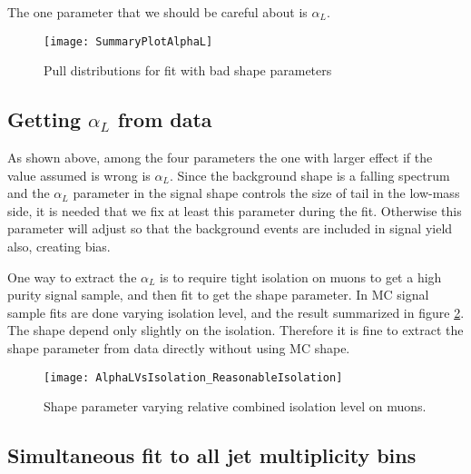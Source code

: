 \documentclass{cmspaper}
\begin{document}
The one parameter that we should be careful about is $\alpha_L$.

\begin{figure}
   \centering
   \texttt{[image: SummaryPlotAlphaL]}
   \caption{Pull distributions for fit with bad shape parameters}
   \label{Figure_BadShapePulls}
\end{figure}


\subsection{Getting $\alpha_L$ from data}

As shown above, among the four parameters the one with larger effect
if the value assumed is wrong is $\alpha_L$.  Since the background
shape is a falling spectrum and the $\alpha_L$ parameter in the signal
shape controls the size of tail in the low-mass side, it is needed
that we fix at least this parameter during the fit.  Otherwise this
parameter will adjust so that the background events are included in
signal yield also, creating bias.

One way to extract the $\alpha_L$ is to require tight isolation on
muons to get a high purity signal sample, and then fit to get the
shape parameter.  In MC signal sample fits are done varying isolation
level, and the result summarized in figure
\ref{Figure_AlphaLVsIsolation}.  The shape depend only slightly on the
isolation.  Therefore it is fine to extract the shape parameter from
data directly without using MC shape.

\begin{figure}
   \begin{center}
   \texttt{[image: AlphaLVsIsolation\_ReasonableIsolation]}
   \caption{Shape parameter varying relative combined isolation level on muons.}
   \label{Figure_AlphaLVsIsolation}
   \end{center}
\end{figure}

\subsection{Simultaneous fit to all jet multiplicity bins}
\label{sec:simfit}
\end{document}
